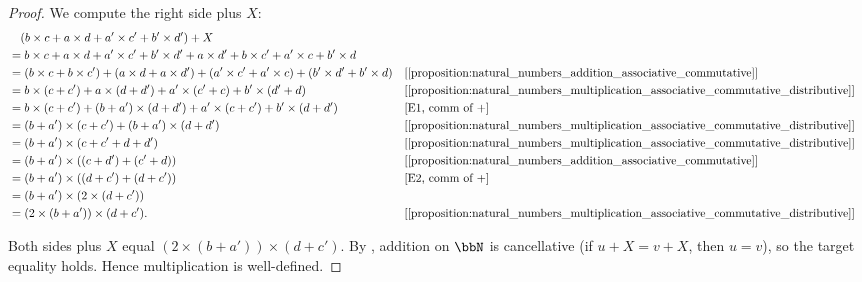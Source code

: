 \begin{proof}
We compute the right side plus $X$:
\begin{align*}
&\quad (b \times c + a \times d + a' \times c' + b' \times d') + X \\
&= b \times c + a \times d + a' \times c' + b' \times d' + a \times d' + b \times c' + a' \times c + b' \times d \\
&= (b \times c + b \times c') + (a \times d + a \times d') + (a' \times c' + a' \times c) + (b' \times d' + b' \times d) && \text{[\Cref{proposition:natural_numbers_addition_associative_commutative}]} \\
&= b \times (c + c') + a \times (d + d') + a' \times (c' + c) + b' \times (d' + d) && \text{[\Cref{proposition:natural_numbers_multiplication_associative_commutative_distributive}]} \\
&= b \times (c + c') + (b + a') \times (d + d') + a' \times (c + c') + b' \times (d + d') && \text{[E1, comm of $+$]} \\
&= (b + a') \times (c + c') + (b + a') \times (d + d') && \text{[\Cref{proposition:natural_numbers_multiplication_associative_commutative_distributive}]} \\
&= (b + a') \times (c + c' + d + d') && \text{[\Cref{proposition:natural_numbers_multiplication_associative_commutative_distributive}]} \\
&= (b + a') \times ((c + d') + (c' + d)) && \text{[\Cref{proposition:natural_numbers_addition_associative_commutative}]} \\
&= (b + a') \times ((d + c') + (d + c')) && \text{[E2, comm of $+$]} \\
&= (b + a') \times (2 \times (d + c')) \\
&= (2 \times (b + a')) \times (d + c'). && \text{[\Cref{proposition:natural_numbers_multiplication_associative_commutative_distributive}]}
\end{align*}

Both sides plus $X$ equal $(2 \times (b + a')) \times (d + c')$. By , addition on $\bbN$ is cancellative (if $u + X = v + X$, then $u = v$), so the target equality holds. Hence multiplication is well-defined.
\end{proof}
